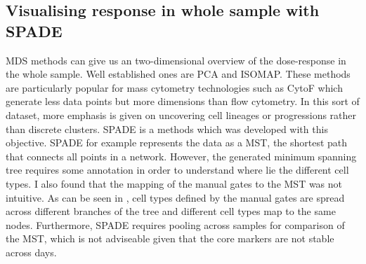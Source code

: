 \subsection{Visualising response in whole sample with SPADE}

\Gls{MDS} methods can give us an two-dimensional overview of the dose-response in the whole sample.  
Well established ones are PCA and ISOMAP.
These methods are particularly popular for mass cytometry technologies such as CytoF which generate less data points but more dimensions than flow cytometry.
In this sort of dataset, more emphasis is given on uncovering cell lineages or progressions rather than discrete clusters.
SPADE is a methods which was developed with this objective.
SPADE for example represents the data as a \gls{MST}, the shortest path that connects all points in a network.
However, the generated minimum spanning tree requires some annotation in order to understand where lie the different cell types.
I also found that the mapping of the manual gates to the MST was not intuitive.
As can be seen in , cell types defined by the manual gates are spread across different branches of the tree
and different cell types map to the same nodes.
Furthermore, SPADE requires pooling across samples for comparison of the \gls{MST}, which is not adviseable given that the core
markers are not stable across days.

